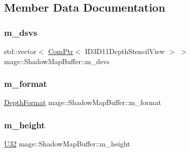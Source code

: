 \subsection{Member Data Documentation}
\hypertarget{structmage_1_1_shadow_map_buffer_a36cb430d4da5bd380e66cf68bb0522c1}{}\label{structmage_1_1_shadow_map_buffer_a36cb430d4da5bd380e66cf68bb0522c1} 
\subsubsection{\texorpdfstring{m\+\_\+dsvs}{m\_dsvs}}
{\footnotesize\ttfamily std\+::vector$<$ \hyperlink{namespacemage_ae74f374780900893caa5555d1031fd79}{Com\+Ptr}$<$ I\+D3\+D11\+Depth\+Stencil\+View $>$ $>$ mage\+::\+Shadow\+Map\+Buffer\+::m\+\_\+dsvs\hspace{0.3cm}{\ttfamily [private]}}

\hypertarget{structmage_1_1_shadow_map_buffer_a84ec323bfc88313547f21051b2b70637}{}\label{structmage_1_1_shadow_map_buffer_a84ec323bfc88313547f21051b2b70637} 
\subsubsection{\texorpdfstring{m\+\_\+format}{m\_format}}
{\footnotesize\ttfamily \hyperlink{namespacemage_a5446ec2e6bddf310216a1640c26576d3}{Depth\+Format} mage\+::\+Shadow\+Map\+Buffer\+::m\+\_\+format\hspace{0.3cm}{\ttfamily [private]}}

\hypertarget{structmage_1_1_shadow_map_buffer_a4e4048bd48e7cd347729f1a675a73ed3}{}\label{structmage_1_1_shadow_map_buffer_a4e4048bd48e7cd347729f1a675a73ed3} 
\subsubsection{\texorpdfstring{m\+\_\+height}{m\_height}}
{\footnotesize\ttfamily \hyperlink{namespacemage_a41c104c036fba3756a74e19f793eeaa1}{U32} mage\+::\+Shadow\+Map\+Buffer\+::m\+\_\+height\hspace{0.3cm}{\ttfamily [private]}}

